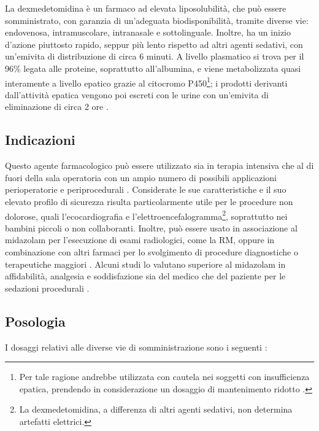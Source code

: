La dexmedetomidina è un farmaco ad elevata liposolubilità, che può essere somministrato, con garanzia di un'adeguata biodisponibilità, tramite diverse vie: endovenosa, intramuscolare, intranasale e sottolinguale. Inoltre, ha un inizio d'azione piuttosto rapido, seppur più lento rispetto ad altri agenti sedativi, con un'emivita di distribuzione di circa 6 minuti. A livello plasmatico si trova per il 96$\%$ legata alle proteine, soprattutto all'albumina, e viene metabolizzata quasi interamente a livello epatico grazie al citocromo P450\footnote{Per tale ragione andrebbe utilizzata con cautela nei soggetti con insufficienza epatica, prendendo in considerazione un dosaggio di mantenimento ridotto \cite{Keating2015}.}; i prodotti derivanti dall'attività epatica vengono poi escreti con le urine con un'emivita di eliminazione di circa 2 ore \cite{Gertler2001, Keating2015, Weerink2017}. 

\subsection*{Indicazioni}

Questo agente farmacologico può essere utilizzato sia in terapia intensiva che al di fuori della sala operatoria con un ampio numero di possibili applicazioni perioperatorie e periprocedurali \cite{Mahmoud2015}. Considerate le sue caratteristiche e il suo elevato profilo di sicurezza risulta particolarmente utile per le procedure non dolorose, quali l'ecocardiografia e l'elettroencefalogramma\footnote{La dexmedetomidina, a differenza di altri agenti sedativi, non determina artefatti elettrici.}, soprattutto nei bambini piccoli o non collaboranti. Inoltre, può essere usato in associazione al midazolam per l'esecuzione di esami radiologici, come la RM, oppure in combinazione con altri farmaci per lo svolgimento di procedure diagnostiche o terapeutiche maggiori \cite{Simeupsedazione}. Alcuni studi lo valutano superiore al midazolam in affidabilità, analgesia e soddisfazione sia del medico che del paziente per le sedazioni procedurali \cite{Barends2017, Lin}.

\subsection*{Posologia}

I dosaggi relativi alle diverse vie di somministrazione sono i seguenti \cite{Simeupsedazione, Uptodatepharmacology}: 


